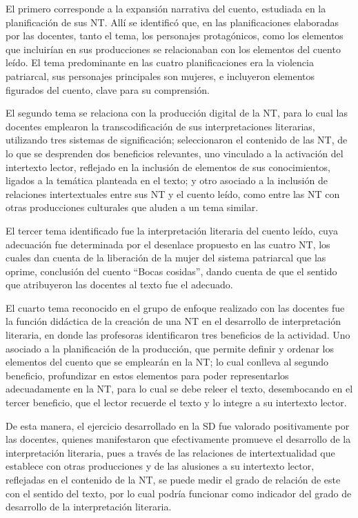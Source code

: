 \documentclass[spanish]{textolivre}
\begin{document}
El primero corresponde a la expansión narrativa del cuento, estudiada en la planificación de sus NT. Allí se identificó que, en las planificaciones elaboradas por las docentes, tanto el tema, los personajes protagónicos, como los elementos que incluirían en sus producciones se relacionaban con los elementos del cuento leído. El tema predominante en las cuatro planificaciones era la violencia patriarcal, sus personajes principales son mujeres, e incluyeron elementos figurados del cuento, clave para su comprensión. 

El segundo tema se relaciona con la producción digital de la NT, para lo cual las docentes emplearon la transcodificación de sus interpretaciones literarias, utilizando tres sistemas de significación; seleccionaron el contenido de las NT, de lo que se desprenden dos beneficios relevantes, uno vinculado a la activación del intertexto lector, reflejado en la inclusión de elementos de sus conocimientos, ligados a la temática planteada en el texto; y otro asociado a la inclusión de relaciones intertextuales entre sus NT y el cuento leído, como entre las NT con otras producciones culturales que aluden a un tema similar. 

El tercer tema identificado fue la interpretación literaria del cuento leído, cuya adecuación fue determinada por el desenlace propuesto en las cuatro NT, los cuales dan cuenta de la liberación de la mujer del sistema patriarcal que las oprime, conclusión del cuento “Bocas cosidas”, dando cuenta de que el sentido que atribuyeron las docentes al texto fue el adecuado. 

El cuarto tema reconocido en el grupo de enfoque realizado con las docentes fue la función didáctica de la creación de una NT en el desarrollo de interpretación literaria, en donde las profesoras identificaron tres beneficios de la actividad. Uno asociado a la planificación de la producción, que permite definir y ordenar los elementos del cuento que se emplearán en la NT; lo cual conlleva al segundo beneficio, profundizar en estos elementos para poder representarlos adecuadamente en la NT, para lo cual se debe releer el texto, desembocando en el tercer beneficio, que el lector recuerde el texto y lo integre a su intertexto lector.  

De esta manera, el ejercicio desarrollado en la SD fue valorado positivamente por las docentes, quienes manifestaron que efectivamente promueve el desarrollo de la interpretación literaria, pues a través de las relaciones de intertextualidad que establece con otras producciones y de las alusiones a su intertexto lector, reflejadas en el contenido de la NT, se puede medir el grado de relación de este con el sentido del texto, por lo cual podría funcionar como indicador del grado de desarrollo de la interpretación literaria. 
\end{document}
